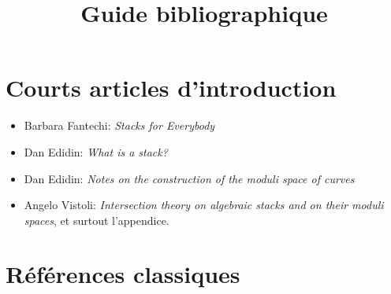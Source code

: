 

%


\title{Guide bibliographique}

\maketitle

\label{section-phantom}

\tableofcontents

\section{Courts articles d'introduction}
\label{section-short-introductions}


\begin{itemize}
\item Barbara Fantechi: \emph{Stacks for Everybody} \cite{fantechi_stacks}
\item Dan Edidin: \emph{What is a stack?} \cite{edidin_whatis}
\item Dan Edidin: \emph{Notes on the construction of the moduli space of
curves} \cite{edidin_notes}
\item Angelo Vistoli: \emph{Intersection theory on algebraic
stacks and on their moduli spaces}, et surtout l'appendice.
\cite{vistoli_intersection}
\end{itemize}


\section{Références classiques}
\label{section-classics}

